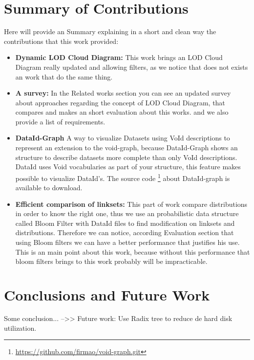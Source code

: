\documentclass{iosart2c}
\begin{document}
\section{Summary of Contributions}
Here will provide an Summary explaining in a short and clean way the contributions that this work provided:
\begin{itemize}
\item \textbf{Dynamic LOD Cloud Diagram:} This work brings an LOD Cloud Diagram really updated and allowing filters, as we notice that does not exists an work that do the same thing.
\item \textbf{A survey:} In the Related works section you can see an updated survey about approaches regarding the concept of LOD Cloud Diagram, that compares and makes an short evaluation about this works. and we also provide a list of requirements.
\item \textbf{DataId-Graph} A way to visualize Datasets using VoId descriptions to represent an extension to the void-graph, because DataId-Graph shows an structure to describe datasets more complete than only VoId descriptions. DataId uses Void vocabularies as part of your structure, this feature makes possible to visualize DataId's. The source code \footnote{\url{https://github.com/firmao/void-graph.git}} about DataId-graph is available to download.
\item \textbf{Efficient comparison of linksets:} This part of work compare distributions in order to know the right one, thus we use an probabilistic data structure called Bloom Filter \cite{bloomfilter} with DataId files to find modification on linksets and distributions. Therefore we can notice, according Evaluation section that using Bloom filters we can have a better performance that justifies his use. This is an main point about this work, because without this performance that bloom filters brings to this work probably will be impracticable.

\end{itemize}


\section{Conclusions and Future Work} %
\label{sec:future}
Some conclusion...
-->> Future work: Use Radix tree to reduce de hard disk utilization.



\end{document}
